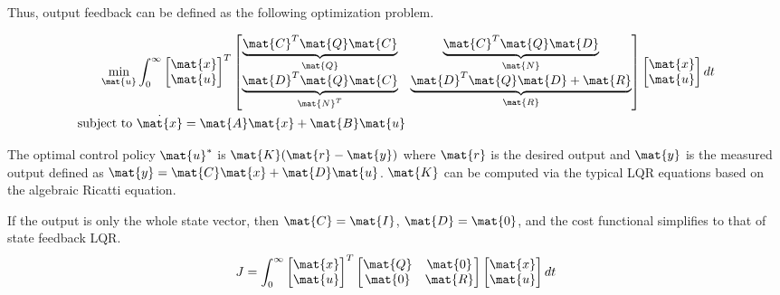 Thus, output feedback can be defined as the following optimization problem.
\begin{theorem}
  \begin{align}
    \min_{\mat{u}} &\int_0^\infty
    \begin{bmatrix}
      \mat{x} \\
      \mat{u}
    \end{bmatrix}^T
    \begin{bmatrix}
      \underbrace{\mat{C}^T\mat{Q}\mat{C}}_{\mat{Q}} &
      \underbrace{\mat{C}^T\mat{Q}\mat{D}}_{\mat{N}} \\
      \underbrace{\mat{D}^T\mat{Q}\mat{C}}_{\mat{N}^T} &
      \underbrace{\mat{D}^T\mat{Q}\mat{D} + \mat{R}}_{\mat{R}}
    \end{bmatrix}
    \begin{bmatrix}
      \mat{x} \\
      \mat{u}
    \end{bmatrix}
    dt \nonumber \\
    \text{subject to } &\dot{\mat{x}} = \mat{A}\mat{x} + \mat{B}\mat{u}
  \end{align}

  The optimal control policy $\mat{u}^*$ is $\mat{K}(\mat{r} - \mat{y})$ where
  $\mat{r}$ is the desired output and $\mat{y}$ is the measured output defined
  as $\mat{y} = \mat{C}\mat{x} + \mat{D}\mat{u}$. $\mat{K}$ can be computed via
  the typical LQR equations based on the algebraic Ricatti equation.
\end{theorem}

If the output is only the whole state vector, then $\mat{C} = \mat{I}$,
$\mat{D} = \mat{0}$, and the cost functional simplifies to that of state
feedback LQR.
\begin{equation*}
  J = \int_0^\infty
  \begin{bmatrix}
    \mat{x} \\
    \mat{u}
  \end{bmatrix}^T
  \begin{bmatrix}
    \mat{Q} & \mat{0} \\
    \mat{0} & \mat{R}
  \end{bmatrix}
  \begin{bmatrix}
    \mat{x} \\
    \mat{u}
  \end{bmatrix}
  dt
\end{equation*}
